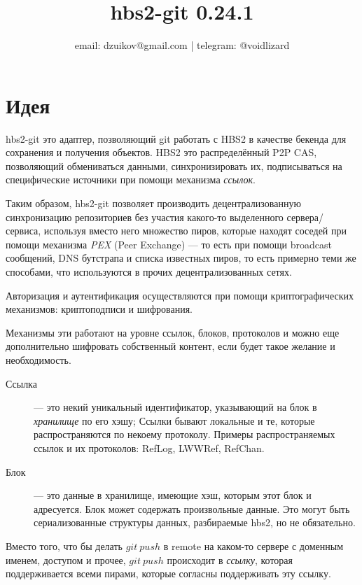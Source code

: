 \documentclass[11pt,a4paper]{article}
\title{hbs2-git 0.24.1}
\author{%
    email: dzuikov@gmail.com | telegram: @voidlizard
}
\newcommand{\term}[2]{\textit{#2}}
\begin{document}
\maketitle

\tableofcontents

\section{Идея}

hbs2-git это адаптер, позволяющий git работать с HBS2 в качестве бекенда для сохранения и получения
объектов. HBS2 это распределённый P2P CAS, позволяющий обмениваться данными, синхронизировать их,
подписываться на специфические источники при помощи механизма \term{references}{ссылок}.

Таким образом, hbs2-git позволяет производить децентрализованную синхронизацию репозиториев без
участия какого-то выделенного сервера/сервиса, используя вместо него множество пиров, которые
находят соседей при помощи механизма \term{pex}{PEX} (Peer Exchange) --- то есть при помощи
broadcast сообщений, DNS бутстрапа и списка известных пиров, то есть примерно  теми же способами,
что используются в прочих децентрализованных сетях.

Авторизация и аутентификация осуществляются при помощи криптографических механизмов: криптоподписи
и шифрования.

Механизмы эти работают на уровне ссылок, блоков, протоколов и можно еще дополнительно шифровать
собственный контент, если будет такое желание и необходимость.

\begin{description}
  \item[Ссылка] --- это некий уникальный идентификатор, указывающий на блок в \textit{хранилище} по
    его хэшу; Ссылки бывают локальные и те, которые распространяются по некоему протоколу. Примеры
    распространяемых ссылок и их протоколов: RefLog, LWWRef, RefChan.

  \item[Блок]   --- это данные в хранилище, имеющие хэш, которым этот блок и адресуется. Блок может
    содержать произвольные данные. Это могут быть сериализованные структуры данных, разбираемые
    hbs2, но не обязательно.
\end{description}


Вместо того, что бы делать $git~push$ в remote на каком-то сервере с доменным именем, доступом и
прочее, $git~push$ происходит в \term{references}{ссылку}, которая поддерживается всеми пирами,
которые согласны поддерживать эту ссылку.
\end{document}
